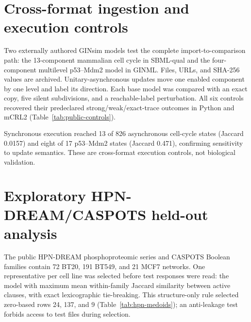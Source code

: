 \documentclass{ws-jbcb}
\numberwithin{equation}{section}
\begin{document}
\section{Cross-format ingestion and execution controls}
\label{sec:public-method}

Two externally authored GINsim models test the complete import-to-comparison
path: the 13-component mammalian cell cycle in SBML-qual and the four-component
multilevel p53--Mdm2 model in GINML.\cite{Naldi2018,Traynard2016,
Chaouiya2013SBML,AbouJaoude2009} Files, URLs, and SHA-256 values are archived.
Unitary-asynchronous updates move one enabled component by one level and label
its direction. Each base model was compared with an exact copy, five silent
subdivisions, and a reachable-label perturbation. All six controls recovered
their predeclared strong/weak/exact-trace outcomes in Python and mCRL2
(Table~\ref{tab:public-controls}).

\begin{table}[t]
\end{table}

Synchronous execution reached 13 of 826 asynchronous cell-cycle states (Jaccard
0.0157) and eight of 17 p53--Mdm2 states (Jaccard 0.471), confirming sensitivity
to update semantics. These are cross-format execution controls, not biological
validation.

\section{Exploratory HPN-DREAM/CASPOTS held-out analysis}\label{sec:hpn-method}

The public HPN-DREAM phosphoproteomic series and CASPOTS Boolean families contain
72 BT20, 191 BT549, and 21 MCF7 networks.\cite{Hill2016,Razzaq2018} One
representative per cell line was selected before test responses were read: the
model with maximum mean within-family Jaccard similarity between active clauses,
with exact lexicographic tie-breaking. This structure-only rule selected
zero-based rows 24, 137, and 9 (Table~\ref{tab:hpn-medoids}); an anti-leakage test
forbids access to test files during selection.
\end{document}
